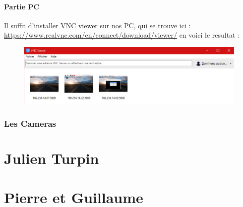 \documentclass[a4paper,11pt]{report}
\begin{document}
			\subsubsection{Partie PC}
			Il suffit d'installer VNC viewer sur nos PC, qui se trouve ici :
			\url{https://www.realvnc.com/en/connect/download/viewer/}
			\newline en voici le resultat :
			\begin{figure}[!h]
				\begin{center}
					\includegraphics[scale=0.5]{Illustrations/6.png}
				\end{center}
			\end{figure}
			
		\subsection{Les Cameras}
		
		
\chapter{Julien Turpin}

\chapter{Pierre et Guillaume}
\end{document}
